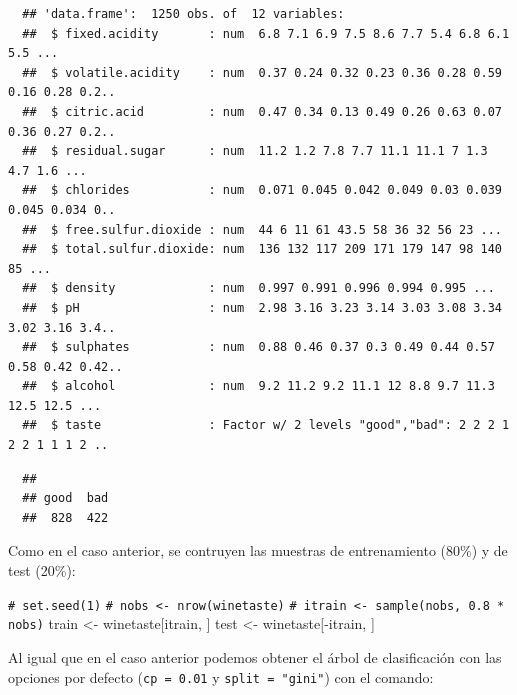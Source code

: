 \documentclass[
]{book}
\newenvironment{Shaded}{\begin{snugshade}}{\end{snugshade}}
\newcommand{\CommentTok}[1]{\textcolor[rgb]{0.56,0.35,0.01}{\textit{#1}}}
\newcommand{\FunctionTok}[1]{\textcolor[rgb]{0.00,0.00,0.00}{#1}}
\newcommand{\NormalTok}[1]{#1}
\newcommand{\OtherTok}[1]{\textcolor[rgb]{0.56,0.35,0.01}{#1}}
\newcommand{\SpecialCharTok}[1]{\textcolor[rgb]{0.00,0.00,0.00}{#1}}
\theoremstyle{break}
\theoremstyle{nonumberplain}
\renewcommand{\CommentTok}[1]{\textcolor[rgb]{0.41,0.41,0.41}{\texttt{#1}}}
\begin{document}
\begin{verbatim}
  ## 'data.frame':  1250 obs. of  12 variables:
  ##  $ fixed.acidity       : num  6.8 7.1 6.9 7.5 8.6 7.7 5.4 6.8 6.1 5.5 ...
  ##  $ volatile.acidity    : num  0.37 0.24 0.32 0.23 0.36 0.28 0.59 0.16 0.28 0.2..
  ##  $ citric.acid         : num  0.47 0.34 0.13 0.49 0.26 0.63 0.07 0.36 0.27 0.2..
  ##  $ residual.sugar      : num  11.2 1.2 7.8 7.7 11.1 11.1 7 1.3 4.7 1.6 ...
  ##  $ chlorides           : num  0.071 0.045 0.042 0.049 0.03 0.039 0.045 0.034 0..
  ##  $ free.sulfur.dioxide : num  44 6 11 61 43.5 58 36 32 56 23 ...
  ##  $ total.sulfur.dioxide: num  136 132 117 209 171 179 147 98 140 85 ...
  ##  $ density             : num  0.997 0.991 0.996 0.994 0.995 ...
  ##  $ pH                  : num  2.98 3.16 3.23 3.14 3.03 3.08 3.34 3.02 3.16 3.4..
  ##  $ sulphates           : num  0.88 0.46 0.37 0.3 0.49 0.44 0.57 0.58 0.42 0.42..
  ##  $ alcohol             : num  9.2 11.2 9.2 11.1 12 8.8 9.7 11.3 12.5 12.5 ...
  ##  $ taste               : Factor w/ 2 levels "good","bad": 2 2 2 1 2 2 1 1 1 2 ..
\end{verbatim}

\begin{Shaded}
\end{Shaded}

\begin{verbatim}
  ## 
  ## good  bad 
  ##  828  422
\end{verbatim}

Como en el caso anterior, se contruyen las muestras de entrenamiento (80\%) y de test (20\%):

\begin{Shaded}
\begin{Highlighting}[]
\CommentTok{\# set.seed(1)}
\CommentTok{\# nobs \textless{}{-} nrow(winetaste)}
\CommentTok{\# itrain \textless{}{-} sample(nobs, 0.8 * nobs)}
\NormalTok{train }\OtherTok{\textless{}{-}}\NormalTok{ winetaste[itrain, ]}
\NormalTok{test }\OtherTok{\textless{}{-}}\NormalTok{ winetaste[}\SpecialCharTok{{-}}\NormalTok{itrain, ]}
\end{Highlighting}
\end{Shaded}

Al igual que en el caso anterior podemos obtener el árbol de clasificación con las opciones por defecto (\texttt{cp\ =\ 0.01} y \texttt{split\ =\ "gini"}) con el comando:
\end{document}
